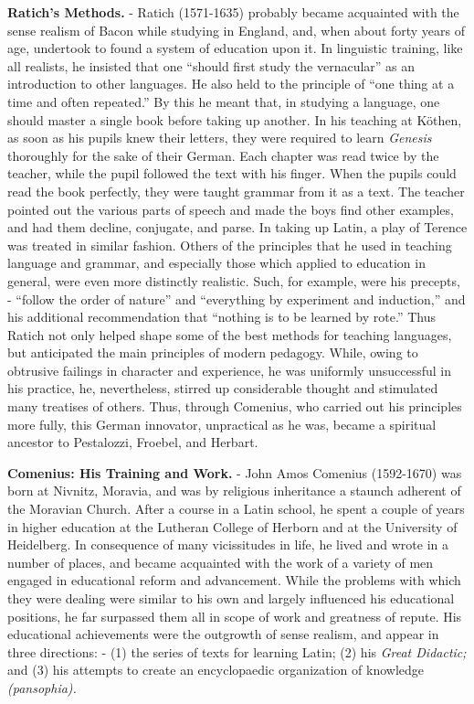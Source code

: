 \documentclass[]{book}
\begin{document}
\textbf{Ratich's Methods.} - Ratich (1571-1635) probably became acquainted with the sense realism of Bacon while studying in England, and, when about forty years of age, undertook to found a system of education upon it. In linguistic training, like all realists, he insisted that one ``should first study the vernacular'' as an introduction to other languages. He also held to the principle of ``one thing at a time and often repeated.'' By this he meant that, in studying a language, one should master a single book before taking up another. In his teaching at Köthen, as soon as his pupils knew their letters, they were required to learn \emph{Genesis} thoroughly for the sake of their German. Each chapter was read twice by the teacher, while the pupil followed the text with his finger. When the pupils could read the book perfectly, they were taught grammar from it as a text. The teacher pointed out the various parts of speech and made the boys find other examples, and had them decline, conjugate, and parse. In taking up Latin, a play of Terence was treated in similar fashion. Others of the principles that he used in teaching language and grammar, and especially those which applied to education in general, were even more distinctly realistic. Such, for example, were his precepts, - ``follow the order of nature'' and ``everything by experiment and induction,'' and his additional recommendation that ``nothing is to be learned by rote.'' Thus Ratich not only helped shape some of the best methods for teaching languages, but anticipated the main principles of modern pedagogy. While, owing to obtrusive failings in character and experience, he was uniformly unsuccessful in his practice, he, nevertheless, stirred up considerable thought and stimulated many treatises of others. Thus, through Comenius, who carried out his principles more fully, this German innovator, unpractical as he was, became a spiritual ancestor to Pestalozzi, Froebel, and Herbart.

\textbf{Comenius: His Training and Work.} - John Amos Comenius (1592-1670) was born at Nivnitz, Moravia, and was by religious inheritance a staunch adherent of the Moravian Church. After a course in a Latin school, he spent a couple of years in higher education at the Lutheran College of Herborn and at the University of Heidelberg. In consequence of many vicissitudes in life, he lived and wrote in a number of places, and became acquainted with the work of a variety of men engaged in educational reform and advancement. While the problems with which they were dealing were similar to his own and largely influenced his educational positions, he far surpassed them all in scope of work and greatness of repute. His educational achievements were the outgrowth of sense realism, and appear in three directions: - (1) the series of texts for learning Latin; (2) his \emph{Great Didactic;} and (3) his attempts to create an encyclopaedic organization of knowledge \emph{(pansophia).}
\end{document}
